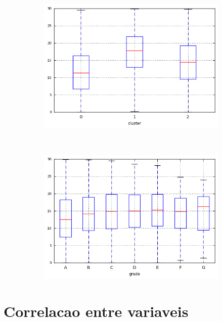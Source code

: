 \begin{anexosenv}
\begin{figure}[t!]
\begin{subfigure}[t]{0.45\textwidth}
            \centerline{\includegraphics[width=1.05\textwidth]{img/dti_by_cluster}}
        \end{subfigure}%
        ~ 
        \begin{subfigure}[t]{0.45\textwidth}
            \centering
   
            \centerline{\includegraphics[width=1.05\textwidth]{img/dti_by_grade}}

        \end{subfigure}
\end{figure}

\chapter{Correlacao entre variaveis}



\end{anexosenv}
